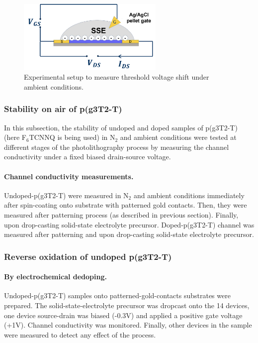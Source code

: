 \begin{figure}[!ht]
	\centering
	\includegraphics[width=7cm]{Images/pdf/bioprobe_setup.pdf}
	\caption{Experimental setup to measure threshold voltage shift under ambient conditions.}
	\label{fig:biosetup}
\end{figure}

\subsubsection{Stability on air of p(g3T2-T)}
In this subsection, the stability of undoped and doped samples of p(g3T2-T) (here F$_{6}$TCNNQ is being used) in N$_{2}$ and ambient conditions were tested at different stages of the photolithography process by measuring the channel conductivity under a fixed biased drain-source voltage. %

\paragraph{Channel conductivity measurements.}Undoped-p(g3T2-T) were measured in N$_{2}$ and ambient conditions immediately after spin-coating onto substrate with patterned gold contacts. Then, they were measured after patterning process (as described in previous section). Finally, upon drop-casting solid-state electrolyte precursor. Doped-p(g3T2-T) channel was measured after patterning and upon drop-casting solid-state electrolyte precursor.

\subsubsection{Reverse oxidation of undoped p(g3T2-T)}

\paragraph{By electrochemical dedoping.}Undoped-p(g3T2-T) samples onto patterned-gold-contacts substrates were prepared. The solid-state-electrolyte precursor was dropcast onto the 14 devices, one device source-drain was biased (-0.3V) and applied a positive gate voltage (+1V). Channel conductivity was monitored. Finally, other devices in the sample were measured to detect any effect of the process.

